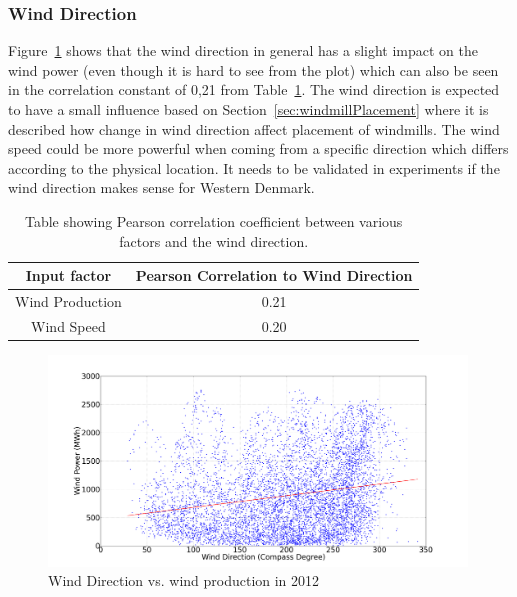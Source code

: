 \subsubsection{Wind Direction}
Figure~\ref{fig:windDirVsProd} shows that the wind direction in general has a slight impact on the wind power (even though it is hard to see from the plot) which can also be seen in the correlation constant of 0,21 from Table~\ref{table:pearsonCoeficientWindDirection}. The wind direction is expected to have a small influence based on Section~\ref{sec:windmillPlacement} where it is described how change in wind direction affect placement of windmills. The wind speed could be more powerful when coming from a specific direction which differs according to the physical location. It needs to be validated in experiments if the wind direction makes sense for Western Denmark.
 
\begin{table}[H]
\centering  %
\begin{tabular}{|c|c|} %
\hline
Input factor & Pearson Correlation to Wind Direction \\ %
\hline                  %
Wind Production & 0.21 \\ \hline %
Wind Speed & 0.20 \\ \hline %
\hline %
\end{tabular}
\caption{Table showing Pearson correlation coefficient between various factors and the wind direction.} %
\label{table:pearsonCoeficientWindDirection} %
\end{table}

\begin{figure}[h!]
\centering
\includegraphics[width=0.99\textwidth]{billeder/productionVsWindDirection.png}
\caption{Wind Direction vs. wind production in 2012}
\label{fig:windDirVsProd}
\end{figure}

